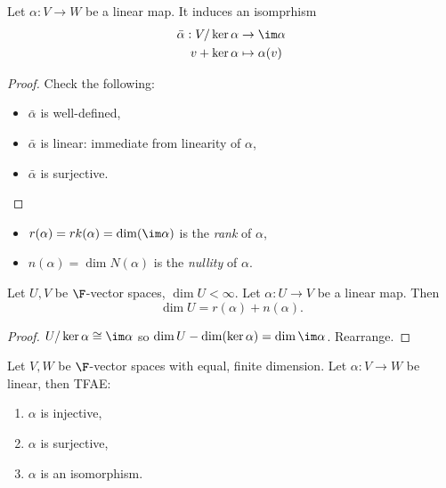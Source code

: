 \documentclass[a4paper]{article}
\theoremstyle{definition}
\begin{document}
\begin{thm}
  Let \(\alpha: V\to W\) be a linear map. It induces an isomprhism
  \begin{align*}
    \bar \alpha: V/\ker \alpha &\to \im \alpha \\
    v + \ker \alpha &\mapsto \alpha(v)
  \end{align*}
\end{thm}

\begin{proof}
  Check the following:
  \begin{itemize}
  \item \(\bar \alpha\) is well-defined,
  \item \(\bar \alpha\) is linear: immediate from linearity of \(\alpha\),
  \item \(\bar \alpha\) is surjective.
  \end{itemize}
\end{proof}

\begin{defi}\leavevmode
  \begin{itemize}
  \item \(r(\alpha) = rk(\alpha) = \dim( \im \alpha)\) is the \emph{rank} of \(\alpha\),
  \item \(n(\alpha) = \dim N(\alpha)\) is the \emph{nullity} of \(\alpha\).
  \end{itemize}
\end{defi}

\begin{thm}
  Let \(U, V\) be \(\F\)-vector spaces, \(\dim U < \infty\). Let \(\alpha:U\to V\) be a linear map. Then
  \[
\dim U = r(\alpha) + n(\alpha).
  \]
\end{thm}

\begin{proof}
  \(U/\ker \alpha \cong \im \alpha\) so \(\dim U - \dim (\ker \alpha) = \dim \im \alpha\). Rearrange.
\end{proof}

\begin{lem}
  Let \(V, W\) be \(\F\)-vector spaces with equal, finite dimension. Let \(\alpha:V\to W\) be linear, then TFAE:
  \begin{enumerate}
  \item \(\alpha\) is injective,
  \item \(\alpha\) is surjective,
  \item \(\alpha\) is an isomorphism.
  \end{enumerate}
\end{lem}
\end{document}
